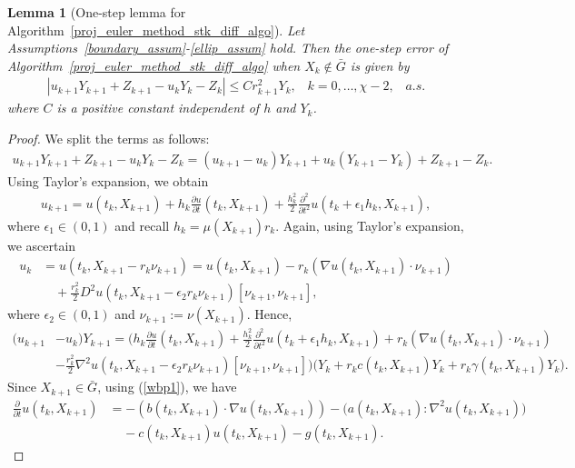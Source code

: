 \documentclass{article}
\newtheorem{lemma}[theorem]{Lemma}
\theoremstyle{definition}
\numberwithin{equation}{section}
\begin{document}
\begin{lemma}[One-step lemma for Algorithm~\ref{proj_euler_method_stk_diff_algo}]\label{proj_euler_one_step}
Let Assumptions~\ref{boundary_assum}-\ref{ellip_assum} hold. Then the one-step error of Algorithm~\ref{proj_euler_method_stk_diff_algo} when $X_{k} \notin \bar{G}$ is given by
\begin{align*}
|u_{k+1}Y_{k+1} + Z_{k+1} - u_{k}Y_{k} - Z_{k}| \leq Cr_{k+1}^{2}Y_{k},\;\;\; k=0,\dots,\chi-2,\;\;\; a.s.
\end{align*}
where $C$ is a positive constant independent of $h$ and $Y_k$. 
\end{lemma}
\begin{proof}
We split the terms as follows: 
\begin{align}
u_{k+1}Y_{k+1} + Z_{k+1} - u_{k}Y_{k} - Z_{k} = (u_{k+1} - u_{k})Y_{k+1} + u_{k}(Y_{k+1} - Y_{k}) + Z_{k+1} - Z_{k}.   
\end{align}
Using Taylor's expansion, we obtain
\begin{align*}
u_{k+1} = u(t_{k}, X_{k+1}) + h_{k}\frac{\partial u}{\partial t} (t_{k}, X_{k+1})  + \frac{h_{k}^{2}}{2}\frac{\partial^2}{\partial t^2} u(t_{k} + \epsilon_{1} h_{k}, X_{k+1}),
\end{align*}
where $\epsilon_1 \in (0, 1)$ and  recall $h_k = \mu(X_{k+1})r_{k}$. Again, using Taylor's expansion, we ascertain
\begin{align*}
u_{k} & = u(t_k, X_{k+1} -r_{k}\nu_{k+1}) = u(t_{k}, X_{k+1}) - r_{k} (\nabla u(t_{k}, X_{k+1}) \cdot \nu_{k+1}) \\ &  \quad + \frac{r_{k}^{2}}{2}D^{2}u(t_{k}, X_{k+1} - \epsilon_{2}r_{k}\nu_{k+1})[\nu_{k+1}, \nu_{k+1}], 
\end{align*}
where $\epsilon_{2} \in (0,1)$ and $\nu_{k+1} := \nu(X_{k+1})$. Hence,
\begin{align}
(u_{k+1}&-u_{k})Y_{k+1} = \Big(h_{k}\frac{\partial u}{\partial t}(t_{k}, X_{k+1})  + \frac{h_{k}^{2}}{2}\frac{\partial^2}{\partial t^2} u(t_{k} + \epsilon_{1} h_{k}, X_{k+1}) + r_{k} (\nabla u(t_{k}, X_{k+1}) \cdot \nu_{k+1}) \nonumber \\ &- \frac{r_{k}^{2}}{2}\nabla^{2}u(t_{k}, X_{k+1} - \epsilon_{2}r_{k}\nu_{k+1})[\nu_{k+1}, \nu_{k+1}]\Big)(Y_{k} + r_{k}c(t_{k}, X_{k+1})Y_{k} + r_{k}\gamma(t_{k}, X_{k+1})Y_{k}\Big). \label{stk_eq_4.3}
\end{align}
Since $X_{k+1} \in \bar{G}$, using (\ref{wbp1}), we  have
\begin{align}
    \frac{\partial}{\partial t}u(t_{k}, X_{k+1}) & = - (b(t_{k}, X_{k+1}) \cdot \nabla u(t_{k}, X_{k+1})) - \big(a(t_{k}, X_{k+1}) : \nabla^2 u(t_{k}, X_{k+1}) \big)\nonumber \\ & \;\;\;\; - c(t_{k},X_{k+1})u(t_{k}, X_{k+1}) - g(t_{k}, X_{k+1}). \label{stk_eq_4.4}

\end{align}
\end{proof}
\end{document}
